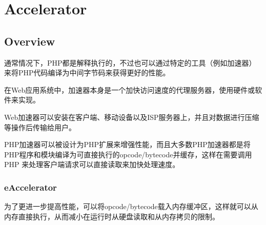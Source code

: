 \begin{lstlisting}[language=bash]

\end{lstlisting}





\begin{lstlisting}[language=bash]

\end{lstlisting}




\begin{lstlisting}[language=bash]

\end{lstlisting}





\begin{lstlisting}[language=bash]

\end{lstlisting}


\chapter{Accelerator}


\section{Overview}



通常情况下，PHP都是解释执行的，不过也可以通过特定的工具（例如加速器）来将PHP代码编译为中间字节码来获得更好的性能。


在Web应用系统中，加速器本身是一个加快访问速度的代理服务器，使用硬件或软件来实现。

Web加速器可以安装在客户端、移动设备以及ISP服务器上，并且对数据进行压缩等操作后传输给用户。

PHP加速器可以被设计为PHP扩展来增强性能，而且大多数PHP加速器都是将PHP程序和模块编译为可直接执行的opcode/bytecode并缓存，这样在需要调用 PHP 来处理客户端请求可以直接读取来加快处理速度。





\subsection{eAccelerator}



为了更进一步提高性能，可以将opcode/bytecode载入内存缓冲区，这样就可以从内存直接执行，从而减小在运行时从硬盘读取和从内存拷贝的限制。




